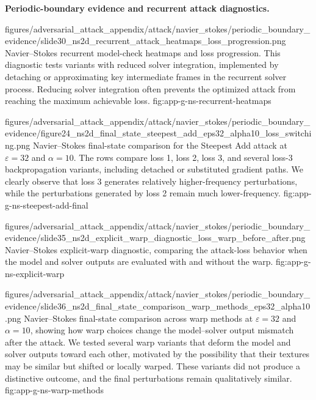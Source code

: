 ﻿\documentclass[letterpaper]{article} %
\newcounter{appendixsection}
\newcounter{appendixsubsection}[appendixsection]
\newcounter{appendixdomain}[appendixsubsection]
\begin{document}
\FloatBarrier
{}

\noindent\textbf{Periodic-boundary evidence and recurrent attack diagnostics.}

\appendixattackfigstacked
  {figures/adversarial_attack_appendix/attack/navier_stokes/periodic_boundary_evidence/slide30_ns2d_recurrent_attack_heatmaps_loss_progression.png}
  {Navier--Stokes recurrent model-check heatmaps and loss progression. This
  diagnostic tests variants with reduced solver integration, implemented by
  detaching or approximating key intermediate frames in the recurrent solver
  process. Reducing solver integration often prevents the optimized attack from
  reaching the maximum achievable loss.}
  {fig:app-g-ns-recurrent-heatmaps}

\appendixattackfigfullportrait
  {figures/adversarial_attack_appendix/attack/navier_stokes/periodic_boundary_evidence/figure24_ns2d_final_state_steepest_add_eps32_alpha10_loss_switching.png}
  {Navier--Stokes final-state comparison for the Steepest Add attack at
  $\varepsilon=32$ and $\alpha=10$. The rows compare loss 1, loss 2, loss 3, and
  several loss-3 backpropagation variants, including detached or substituted
  gradient paths. We clearly observe that loss 3 generates relatively
  higher-frequency perturbations, while the perturbations generated by loss 2
  remain much lower-frequency.}
  {fig:app-g-ns-steepest-add-final}

\appendixattackfigportraitwidelarge
  {figures/adversarial_attack_appendix/attack/navier_stokes/periodic_boundary_evidence/slide35_ns2d_explicit_warp_diagnostic_loss_warp_before_after.png}
  {Navier--Stokes explicit-warp diagnostic, comparing the attack-loss behavior when
  the model and solver outputs are evaluated with and without the warp.}
  {fig:app-g-ns-explicit-warp}

\appendixattackfigportraitwidelarge
  {figures/adversarial_attack_appendix/attack/navier_stokes/periodic_boundary_evidence/slide36_ns2d_final_state_comparison_warp_methods_eps32_alpha10.png}
  {Navier--Stokes final-state comparison across warp methods at $\varepsilon=32$
  and $\alpha=10$, showing how warp choices change the model--solver output
  mismatch after the attack. We tested several warp variants that deform the
  model and solver outputs toward each other, motivated by the possibility that
  their textures may be similar but shifted or locally warped. These variants
  did not produce a distinctive outcome, and the final perturbations remain
  qualitatively similar.}
  {fig:app-g-ns-warp-methods}
\end{document}
